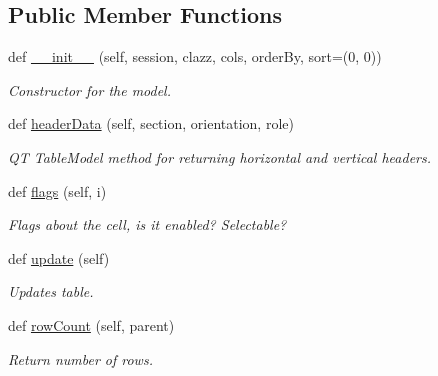\subsection*{Public Member Functions}
\begin{DoxyCompactItemize}
\item 
def \mbox{\hyperlink{classgui_1_1sqlalchemy__model_1_1_sqlalchemy_model_a9ffd76f7412b24c134321f25ce79f8d6}{\+\_\+\+\_\+init\+\_\+\+\_\+}} (self, session, clazz, cols, order\+By, sort=(0, 0))
\begin{DoxyCompactList}\small\item\em Constructor for the model. \end{DoxyCompactList}\item 
def \mbox{\hyperlink{classgui_1_1sqlalchemy__model_1_1_sqlalchemy_model_afaf2907c8a587abff8763c5d924e18c5}{header\+Data}} (self, section, orientation, role)
\begin{DoxyCompactList}\small\item\em QT Table\+Model method for returning horizontal and vertical headers. \end{DoxyCompactList}\item 
\mbox{\label{classgui_1_1sqlalchemy__model_1_1_sqlalchemy_model_a63edb5fa0270c565acdde95e190eb397}} 
def \mbox{\hyperlink{classgui_1_1sqlalchemy__model_1_1_sqlalchemy_model_a63edb5fa0270c565acdde95e190eb397}{flags}} (self, i)
\begin{DoxyCompactList}\small\item\em Flags about the cell, is it enabled? Selectable? \end{DoxyCompactList}\item 
\mbox{\label{classgui_1_1sqlalchemy__model_1_1_sqlalchemy_model_a6f8202acf5d47929e8a608869a27dcf1}} 
def \mbox{\hyperlink{classgui_1_1sqlalchemy__model_1_1_sqlalchemy_model_a6f8202acf5d47929e8a608869a27dcf1}{update}} (self)
\begin{DoxyCompactList}\small\item\em Updates table. \end{DoxyCompactList}\item 
def \mbox{\hyperlink{classgui_1_1sqlalchemy__model_1_1_sqlalchemy_model_ab02e6915e11afc7765cdc9c0e3560517}{row\+Count}} (self, parent)
\begin{DoxyCompactList}\small\item\em Return number of rows. \end{DoxyCompactList}\item 

\end{DoxyCompactItemize}
